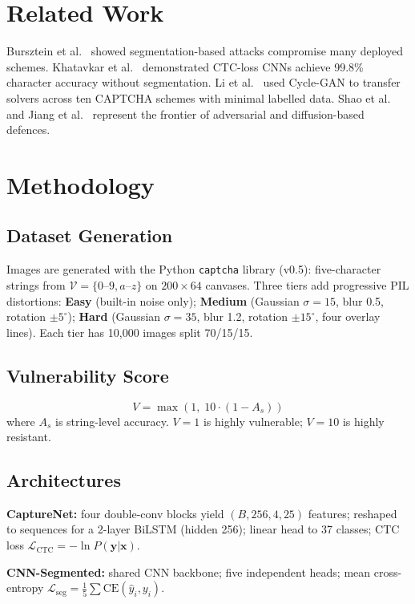 ﻿\documentclass[conference]{IEEEtran}
\begin{document}
\section{Related Work}
Bursztein et al.\ \cite{b4} showed segmentation-based attacks compromise many deployed schemes. Khatavkar et al.\ \cite{b5} demonstrated CTC-loss CNNs achieve 99.8\% character accuracy without segmentation. Li et al.\ \cite{b6} used Cycle-GAN to transfer solvers across ten CAPTCHA schemes with minimal labelled data. Shao et al.\ \cite{b7} and Jiang et al.\ \cite{b8} represent the frontier of adversarial and diffusion-based defences.

\section{Methodology}

\subsection{Dataset Generation}
Images are generated with the Python \texttt{captcha} library (v0.5): five-character strings from $\mathcal{V}=\{0\text{--}9,a\text{--}z\}$ on $200\times64$ canvases. Three tiers add progressive PIL distortions: \textbf{Easy} (built-in noise only); \textbf{Medium} (Gaussian $\sigma{=}15$, blur 0.5, rotation $\pm5^{\circ}$); \textbf{Hard} (Gaussian $\sigma{=}35$, blur 1.2, rotation $\pm15^{\circ}$, four overlay lines). Each tier has 10,000 images split 70/15/15.

\subsection{Vulnerability Score}
\begin{equation}
V = \max(1,\;10\cdot(1-A_s))
\label{eq:vscore}
\end{equation}
where $A_s$ is string-level accuracy. $V{=}1$ is highly vulnerable; $V{=}10$ is highly resistant.

\subsection{Architectures}
\textbf{CaptureNet:} four double-conv blocks yield $(B,256,4,25)$ features; reshaped to sequences for a 2-layer BiLSTM (hidden 256); linear head to 37 classes; CTC loss $\mathcal{L}_\text{CTC}=-\ln P(\mathbf{y}|\mathbf{x})$.

\textbf{CNN-Segmented:} shared CNN backbone; five independent heads; mean cross-entropy $\mathcal{L}_\text{seg}=\frac{1}{5}\sum\text{CE}(\hat{y}_i,y_i)$.
\end{document}
